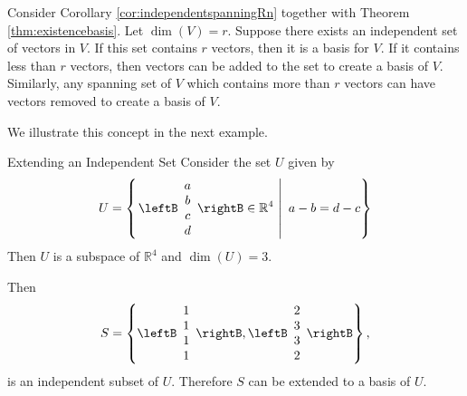 Consider Corollary \ref{cor:independentspanningRn} together with Theorem \ref{thm:existencebasis}. Let $\dim(V) = r$. Suppose there exists an independent set of vectors in $V$. If this set contains $r$ vectors, then it is a basis for $V$. If it contains less than $r$ vectors, then vectors can be added to the set to create a basis of $V$. Similarly, any spanning set of $V$ which contains more than $r$ vectors can have vectors removed to create a basis of $V$.

We illustrate this concept in the next example.

\begin{example}{Extending an Independent Set}\label{exa:extendindependent}
Consider the set $U$ given by 
\[ U=\left\{ \left.\leftB\begin{array}{c} a\\ b\\ c\\ d\end{array}\rightB
\in\mathbb{R}^4 ~\right|~ a-b=d-c \right\}\]
Then $U$ is a subspace of $\mathbb{R}^4$ and $\dim(U)=3$.

Then
\[S=\left\{ 
\leftB\begin{array}{c} 1\\ 1\\ 1\\ 1\end{array}\rightB,
\leftB\begin{array}{c} 2\\ 3\\ 3\\ 2\end{array}\rightB \right\},\]
is an independent subset of $U$.
Therefore $S$ can be extended to a basis of $U$.
\end{example}

